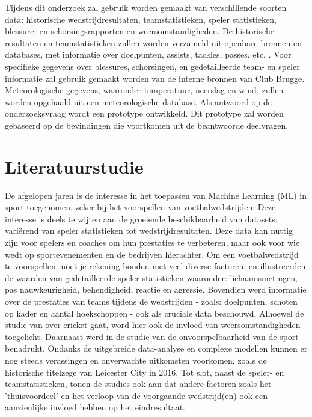 Tijdens dit onderzoek zal gebruik worden gemaakt van verschillende soorten data: historische wedstrijdresultaten, teamstatistieken, speler statistieken, blessure- en schorsingsrapporten en weersomstandigheden. De historische resultaten en teamstatistieken zullen worden verzameld uit openbare bronnen en databases, met informatie over doelpunten, assists, tackles, passes, etc. . Voor specifieke gegevens over blessures, schorsingen, en gedetailleerde team- en speler informatie zal gebruik gemaakt worden van de interne bronnen van Club Brugge. Meteorologische gegevens, waaronder temperatuur, neerslag en wind, zullen worden opgehaald uit een meteorologische database.
Als antwoord op de onderzoeksvraag wordt een prototype ontwikkeld. Dit prototype zal worden gebaseerd op de bevindingen die voortkomen uit de beantwoorde deelvragen.


\section{Literatuurstudie}%
\label{sec:state-of-the-art}

De afgelopen jaren is de interesse in het toepassen van Machine Learning (ML) in sport toegenomen, zeker bij het voorspellen van voetbalwedstrijden. Deze interesse is deels te wijten aan de groeiende beschikbaarheid van datasets, variërend van speler statistieken tot wedstrijdresultaten. Deze data kan nuttig zijn voor spelers en coaches om hun prestaties te verbeteren, maar ook voor wie wedt op sportevenementen en de bedrijven hierachter.
Om een voetbalwedstrijd te voorspellen moet je rekening houden met veel diverse factoren. \textcite{Stuebinger2019} en \textcite{Rodrigues2022} illustreerden de waarden van gedetailleerde speler statistieken waaronder: lichaamsmetingen, pas nauwkeurigheid, behendigheid, reactie en agressie. Bovendien werd informatie over de prestaties van teams tijdens de wedstrijden - zoals: doelpunten, schoten op kader en aantal hoekschoppen - ook als cruciale data beschouwd. Alhoewel de studie van \textcite{Sathyanarayana2022} over cricket gaat, word hier ook de invloed van weersomstandigheden toegelicht.
Daarnaast werd in de studie van \textcite{Baboota2019} de onvoorspelbaarheid van de sport benadrukt. Ondanks de uitgebreide data-analyse en complexe modellen kunnen er nog steeds verassingen en onverwachte uitkomsten voorkomen, zoals de historische titelzege van Leicester City in 2016.
Tot slot, naast de speler- en teamstatistieken, tonen de studies ook aan dat andere factoren zoals het 'thuisvoordeel' en het verloop van de voorgaande wedstrijd(en) ook een aanzienlijke invloed hebben op het eindresultaat.

